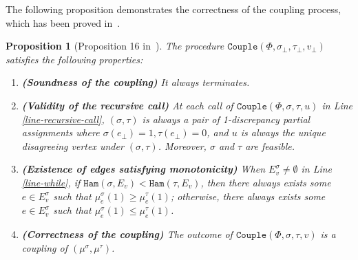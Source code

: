 \documentclass[11pt]{article}
\newtheorem{proposition}[theorem]{Proposition}
\def\!#1{\mathtt{#1}}
\newcommand{\hktodo}[1]{{\color{blue}{#1}}}
\newcommand{\zd}[1]{{\color{green} #1}}
\begin{document}
The following proposition demonstrates the correctness of the coupling process, which has been proved in~\cite{CG24bMatching}.
\begin{proposition}[Proposition 16 in~\cite{CG24bMatching}] \label{prop:coupling-correctness}
    The procedure $\!{Couple}(\Phi, \sigma_\bot, \tau_\bot, v_\bot)$ 
    satisfies the following properties:
    \begin{enumerate}
        \item \textbf{(Soundness of the coupling)} It always terminates.
        
        \item \textbf{(Validity of the recursive call)} At each call of $\!{Couple}(\Phi, \sigma, \tau, u)$ in Line \ref{line-recursive-call}, $(\sigma, \tau)$ is always a pair of 1-discrepancy partial assignments where $\sigma(e_\bot) = 1, \tau(e_\bot) = 0$, and $u$ is always the unique disagreeing vertex under $(\sigma, \tau)$. Moreover, $\sigma$ and $\tau$ are feasible.
        
        \item \textbf{(Existence of edges satisfying monotonicity)} When $E_v^\sigma \neq \emptyset$ in Line \ref{line-while}, if $\!{Ham}(\sigma, E_v) < \!{Ham}(\tau, E_v)$, then there always exists some $e \in E_v^\sigma$ such that $\mu_e^\sigma(1) \ge \mu^\tau_e(1)$; otherwise, there always exists some $e \in E_v^\sigma$ such that $\mu_e^\sigma(1) \le \mu^\tau_e(1)$.
        
        \item \textbf{(Correctness of the coupling)} The outcome of $\!{Couple}(\Phi, \sigma, \tau, v)$ is a coupling of $(\mu^{\sigma}, \mu^{\tau})$.
    \end{enumerate}
\end{proposition}

    
\end{document}

